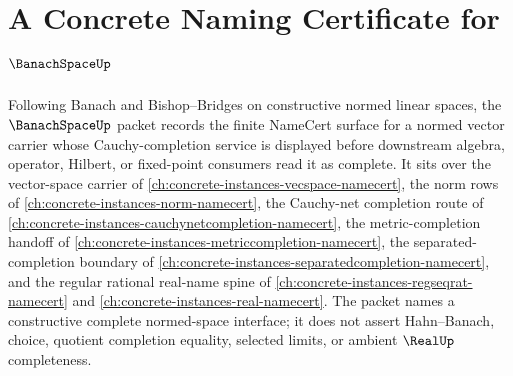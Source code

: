 \chapter{A Concrete Naming Certificate for $\BanachSpaceUp$}
\label{ch:concrete-instances-banachspace-namecert}

Following Banach and Bishop--Bridges on constructive normed linear spaces, the $\BanachSpaceUp$ packet records the finite NameCert surface for a normed vector carrier whose Cauchy-completion service is displayed before downstream algebra, operator, Hilbert, or fixed-point consumers read it as complete. It sits over the vector-space carrier of \autoref{ch:concrete-instances-vecspace-namecert}, the norm rows of \autoref{ch:concrete-instances-norm-namecert}, the Cauchy-net completion route of \autoref{ch:concrete-instances-cauchynetcompletion-namecert}, the metric-completion handoff of \autoref{ch:concrete-instances-metriccompletion-namecert}, the separated-completion boundary of \autoref{ch:concrete-instances-separatedcompletion-namecert}, and the regular rational real-name spine of \autoref{ch:concrete-instances-regseqrat-namecert} and \autoref{ch:concrete-instances-real-namecert}. The packet names a constructive complete normed-space interface; it does not assert Hahn--Banach, choice, quotient completion equality, selected limits, or ambient $\RealUp$ completeness.

